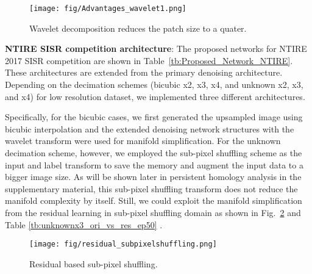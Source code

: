 \documentclass[10pt,twocolumn,letterpaper]{article}
\begin{document}
\begin{figure}[t]
\centerline{\texttt{[image: fig/Advantages\_wavelet1.png]}}
\caption{Wavelet decomposition reduces the patch size to a quater.}
\label{fig:Advantages_wavelet1}
\end{figure}


{\bf NTIRE SISR competition architecture}: 
The proposed networks for NTIRE 2017 SISR competition are shown in Table~\ref{tb:Proposed_Network_NTIRE}. These architectures are extended from the primary denoising architecture.
Depending on the decimation schemes (bicubic x2, x3, x4, and unknown x2, x3, and x4) for low resolution dataset, we implemented three different architectures.

Specifically, for the bicubic cases, we first generated the upsampled image using bicubic interpolation and the extended denoising network structures with the wavelet transform were used for manifold simplification.
For the unknown decimation scheme, however, we employed the sub-pixel shuffling scheme \cite{shi2016real} as the input and label transform to save the memory and augment the input data to a bigger image size. 
As will be shown later in persistent homology analysis in the supplementary material, this sub-pixel shuffling transform does not reduce the manifold complexity by itself. Still, we could exploit the manifold simplification from the residual learning in sub-pixel shuffling domain as shown in Fig.~\ref{fig:residual_subpixelshuffling} and Table \ref{tb:unknownx3_ori_vs_res_ep50} .

\begin{figure}[!h]
\centerline{\texttt{[image: fig/residual\_subpixelshuffling.png]}}
\caption{Residual based sub-pixel shuffling.}
\label{fig:residual_subpixelshuffling}
\end{figure}

\begin{table}[!h]
\begin{center}
\end{center}
\caption{The effectiveness of the residual based sub-pixel shuffling in terms of PSNR/SSIM for ``Unknown x3' datset in the super-resolution task. The training step was stopped at epoch 50 and the results are calculated from 100 validation data of DIV2K dataset. }
\label{tb:unknownx3_ori_vs_res_ep50}
\end{table}
\end{document}

